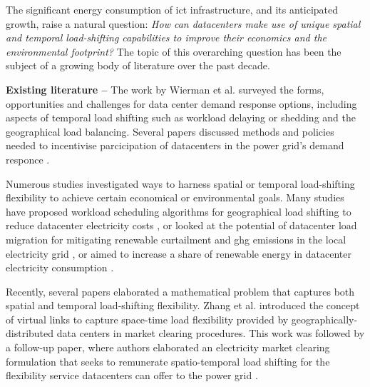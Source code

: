 The significant energy consumption of \gls{ict} infrastructure, and its anticipated growth, raise a natural question: \textit{How can datacenters make use of unique spatial and temporal load-shifting capabilities to improve their economics and the environmental footprint?} The topic of this overarching question has been the subject of a growing body of literature over the past decade.

\textbf{Existing literature --} The work by Wierman et al.  \cite{wiermanOpportunitiesChallengesData2014} surveyed the forms, opportunities and challenges for data center demand response options, including aspects of temporal load shifting such as workload delaying or shedding and the geographical load balancing. Several papers discussed methods and policies needed to incentivise parcicipation of datacenters in the power grid's demand responce \cite{liuPricingDataCenter2014, zhouTruthfulEfficientIncentive2020}.

Numerous studies investigated ways to harness spatial or temporal load-shifting flexibility to achieve certain economical or environmental goals. Many studies have proposed workload scheduling algorithms for geographical load shifting to reduce datacenter electricity costs \cite{velascoElasticOperationsFederated2014, douCarbonAwareElectricityCost2017, heMinimizingOperationCost2021, raoDistributedCoordinationInternet2012, renCarbonAwareEnergyCapacity2012, dengEcoAwareOnlinePower2016}, or looked at the potential of datacenter load migration for mitigating renewable curtailment and \gls{ghg} emissions in the local electricity grid \cite{zhengMitigatingCurtailmentCarbon2020, mahmudDistributedFrameworkCarbon2016}, or aimed to increase a share of renewable energy in datacenter electricity consumption \cite{wangGreenawareVirtualMachine2015, kimDataCentersDispatchable2017, liuGeographicalLoadBalancing2011, kellyBalancingPowerSystems2016}.

Recently, several papers elaborated a mathematical problem that captures both spatial and temporal load-shifting flexibility. Zhang et al. \cite{zhangFlexibilityNetworksData2020} introduced the concept of virtual links to capture space-time load flexibility provided by geographically-distributed data centers in market clearing procedures. This work was followed by a follow-up paper, where authors elaborated an electricity market clearing formulation that seeks to remunerate spatio-temporal load shifting for the flexibility service datacenters can offer to the power grid \cite{zhangRemuneratingSpaceTime2022}.

